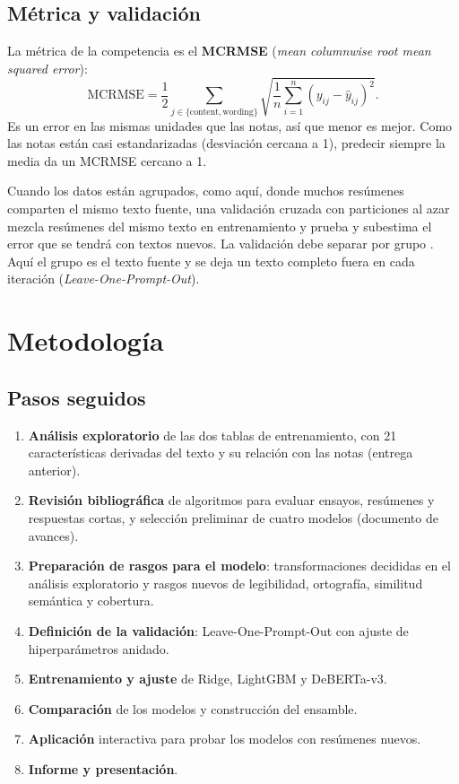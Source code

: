 \documentclass[11pt,a4paper]{article}
\begin{document}
\subsection{Métrica y validación}

La métrica de la competencia es el \textbf{MCRMSE} (\emph{mean columnwise root mean squared error}):
\[
\mathrm{MCRMSE}=\frac{1}{2}\sum_{j\in\{\text{content},\text{wording}\}}\sqrt{\frac{1}{n}\sum_{i=1}^{n}\left(y_{ij}-\hat y_{ij}\right)^2}.
\]
Es un error en las mismas unidades que las notas, así que menor es mejor. Como las notas están casi estandarizadas (desviación cercana a 1), predecir siempre la media da un MCRMSE cercano a 1.

Cuando los datos están agrupados, como aquí, donde muchos resúmenes comparten el mismo texto fuente, una validación cruzada con particiones al azar mezcla resúmenes del mismo texto en entrenamiento y prueba y subestima el error que se tendrá con textos nuevos. La validación debe separar por grupo \citep{roberts2017}. Aquí el grupo es el texto fuente y se deja un texto completo fuera en cada iteración (\emph{Leave-One-Prompt-Out}).

\section{Metodología}\label{sec:metodologia}

\subsection{Pasos seguidos}

\begin{enumerate}[nosep]
\item \textbf{Análisis exploratorio} de las dos tablas de entrenamiento, con 21 características derivadas del texto y su relación con las notas (entrega anterior).
\item \textbf{Revisión bibliográfica} de algoritmos para evaluar ensayos, resúmenes y respuestas cortas, y selección preliminar de cuatro modelos (documento de avances).
\item \textbf{Preparación de rasgos para el modelo}: transformaciones decididas en el análisis exploratorio y rasgos nuevos de legibilidad, ortografía, similitud semántica y cobertura.
\item \textbf{Definición de la validación}: Leave-One-Prompt-Out con ajuste de hiperparámetros anidado.
\item \textbf{Entrenamiento y ajuste} de Ridge, LightGBM y DeBERTa-v3.
\item \textbf{Comparación} de los modelos y construcción del ensamble.
\item \textbf{Aplicación} interactiva para probar los modelos con resúmenes nuevos.
\item \textbf{Informe y presentación}.
\end{enumerate}
\end{document}
